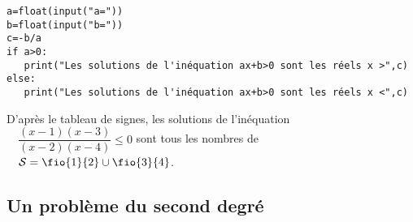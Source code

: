 \documentclass[a4paper,11pt,exos]{nsi} %
\begin{document}
\exo{}
\begin{pyc}
    \begin{verbatim}
a=float(input("a="))
b=float(input("b="))
c=-b/a
if a>0:
   print("Les solutions de l'inéquation ax+b>0 sont les réels x >",c)
else:
   print("Les solutions de l'inéquation ax+b>0 sont les réels x <",c)        
    \end{verbatim}
\end{pyc}


\exo{}



\begin{center}
\end{center}


D'après le tableau de signes, les solutions de l'inéquation $\quad \dfrac{(x-1)(x-3)}{(x-2)(x-4)}\leqslant 0$ sont tous les nombres de $\quad\mathcal{S}=\fio{1}{2}\cup\fio{3}{4}$.

\subsection*{Un problème du second degré}
\end{document}
